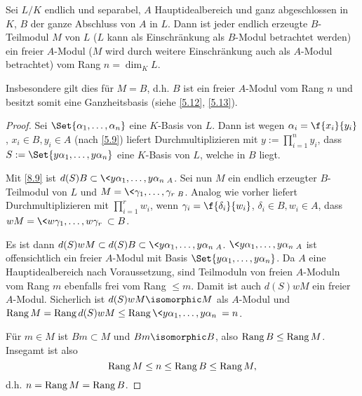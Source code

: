 \begin{st} \label{8.10}
	Sei $L / K$ endlich und separabel, $A$ Hauptidealbereich und ganz abgeschlossen in $K$, $B$ der ganze Abschluss von $A$ in $L$.
	Dann ist jeder endlich erzeugte $B$-Teilmodul $M$ von $L$ ($L$ kann als Einschränkung als $B$-Modul betrachtet werden) ein freier $A$-Modul ($M$ wird durch weitere Einschränkung auch als $A$-Modul betrachtet) vom Rang $n = \dim_K L$.

	Insbesondere gilt dies für $M = B$, d.h. $B$ ist ein freier $A$-Modul vom Rang $n$ und besitzt somit eine Ganzheitsbasis (siehe \ref{5.12}, \ref{5.13}).
	\begin{proof}
		Sei $\Set{\alpha_1, \dotsc, \alpha_n}$ eine $K$-Basis von $L$.
		Dann ist wegen $\alpha_i = \f{x_i}{y_i}$, $x_i \in B, y_i \in A$ (nach \ref{5.9}) liefert Durchmultiplizieren mit $y := \prod_{i=1}^n y_i$, dass $S := \Set{y\alpha_1, \dotsc, y\alpha_n}$ eine $K$-Basis von $L$, welche in $B$ liegt.

		Mit \ref{8.9} ist $d(S)B \subset \<y\alpha_1, \dotsc, y\alpha_n\>_A$.
		Sei nun $M$ ein endlich erzeugter $B$-Teilmodul von $L$ und $M = \< \gamma_1, \dotsc, \gamma_r \>_B$.
		Analog wie vorher liefert Durchmultiplizieren mit $\prod_{i=1}^r w_i$, wenn $\gamma_i = \f {\delta_i}{w_i}$, $\delta_i \in B, w_i \in A$, dass $wM = \<w\gamma_1, \dotsc, w\gamma_r\> \subset B$.

		Es ist dann $d(S) w M \subset d(S) B \subset \<y \alpha_1, \dotsc, y \alpha_n\>_A$.
		$\<y\alpha_1, \dotsc, y \alpha_n\>_A$ ist offensichtlich ein freier $A$-Modul mit Basis $\Set{y\alpha_1, \dotsc, y\alpha_n}$.
		Da $A$ eine Hauptidealbereich nach Voraussetzung, sind Teilmoduln von freien $A$-Moduln vom Rang $m$ ebenfalls frei vom Rang $\le m$.
		Damit ist auch $d(S) w M$ ein freier $A$-Modul.
		Sicherlich ist $d(S) w M \isomorphic M$ als $A$-Modul und $\Rang M = \Rang d(S) w M \le \Rang \<y\alpha_1, \dotsc, y\alpha_n \> = n$.

		Für $m \in M$ ist $Bm \subset M$ und $Bm \isomorphic B$, also $\operatorname{Rang} B \le \operatorname{Rang} M$.
		Insegamt ist also
		\[
			\operatorname{Rang} M \le n \le \operatorname{Rang} B \le \operatorname{Rang} M,
		\]
		d.h. $n = \operatorname{Rang} M = \operatorname{Rang} B$.
	\end{proof}
\end{st}

